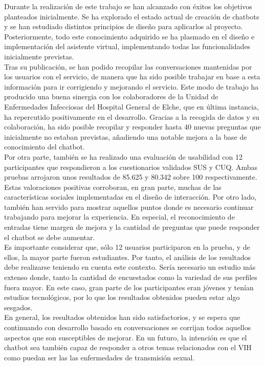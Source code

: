 Durante la realización de este trabajo se han alcanzado con éxitos los objetivos planteados inicialmente. Se ha explorado el estado actual de creación de chatbots y se han estudiado distintos principios de diseño para aplicarlos al proyecto. Posteriormente, todo este conocimiento adquirido se ha plasmado en el diseño e implementación del asistente virtual, implementando todas las funcionalidades inicialmente previstas.\\

Tras su publicación, se han podido recopilar las conversaciones mantenidas por los usuarios con el servicio, de manera que ha sido posible trabajar en base a esta información para ir corrigiendo y mejorando el servicio. Este modo de trabajo ha producido una buena sinergia con los colaboradores de la Unidad de Enfermedades Infecciosas del Hospital General de Elche, que en última instancia, ha repercutido positivamente en el desarrollo. Gracias a la recogida de datos y su colaboración, ha sido posible recopilar y responder hasta 40 nuevas preguntas que inicialmente no estaban previstas, añadiendo una notable mejora a la base de conocimiento del chatbot.\\

Por otra parte, también se ha realizado una evaluación de usabilidad con 12 participantes que respondieron a los cuestionarios validados SUS y CUQ. Ambas pruebas arrojaron unos resultados de 85.625 y 80.342 sobre 100 respectivamente. Estas valoraciones positivas corroboran, en gran parte, muchas de las características sociales implementadas en el diseño de interacción. Por otro lado, también han servido para mostrar aquellos puntos donde es necesario continuar trabajando para mejorar la experiencia. En especial, el reconocimiento de entradas tiene margen de mejora y la cantidad de preguntas que puede responder el chatbot se debe aumentar.\\

Es importante considerar que, sólo 12 usuarios participaron en la prueba, y de ellos, la mayor parte fueron estudiantes. Por tanto, el análisis de los resultados debe realizarse teniendo en cuenta este contexto. Sería necesario un estudio más extenso donde, tanto la cantidad de encuestados como la variedad de sus perfiles fuera mayor. En este caso, gran parte de los participantes eran jóvenes y tenían estudios tecnológicos, por lo que los resultados obtenidos pueden estar algo sesgados.\\

En general, los resultados obtenidos han sido satisfactorios, y se espera que continuando con desarrollo basado en conversaciones se corrijan todos aquellos aspectos que son susceptibles de mejorar. En un futuro, la intención es que el chatbot sea también capaz de responder a otros temas relacionados con el VIH como puedan ser las las enfermedades de transmisión sexual.\\


